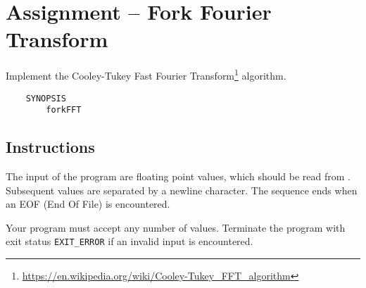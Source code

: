 
\usepackage{amsmath}
\usepackage{multicol}



\section*{Assignment -- Fork Fourier Transform}
Implement the Cooley-Tukey Fast Fourier Transform\footnote{\url{https://en.wikipedia.org/wiki/Cooley-Tukey\_FFT\_algorithm}} algorithm.
\begin{verbatim}
    SYNOPSIS
        forkFFT
\end{verbatim}

\subsection*{Instructions}
The input of the program are floating point values, which should be read from .
Subsequent values are separated by a newline character.
The sequence ends when an EOF (End Of File) is encountered.

Your program must accept any number of values.
Terminate the program with exit status \verb|EXIT_ERROR|
if an invalid input is encountered.

